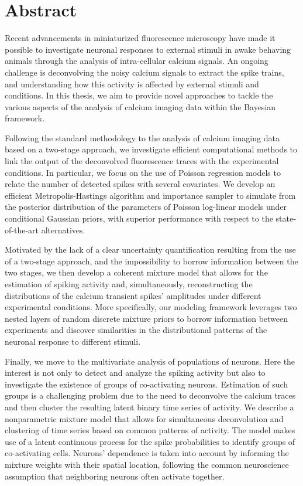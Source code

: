 \chapter*{Abstract} 
Recent advancements in miniaturized fluorescence microscopy have made it possible to investigate neuronal responses to external stimuli in awake behaving animals through the analysis of intra-cellular calcium signals. 
An ongoing challenge is deconvolving the noisy calcium signals to extract the spike trains, and understanding how this activity is affected by external stimuli and conditions.
In this thesis, we aim to provide novel approaches to tackle the various aspects of the analysis of calcium imaging data within the Bayesian framework.

Following the standard methodology to the analysis of calcium imaging data based on a two-stage approach, we investigate efficient computational methods to link the output of the deconvolved fluorescence traces with the experimental conditions. In particular, we focus on the use of Poisson regression models to relate the number of detected spikes with several covariates. We develop an efficient Metropolis-Hastings algorithm and importance sampler to simulate from the posterior distribution of the parameters of Poisson log-linear models under conditional Gaussian priors, with superior performance with respect to the state-of-the-art alternatives. 

Motivated by the lack of a clear uncertainty quantification resulting from the use of a two-stage approach, and the impossibility to borrow information between the two stages, we then develop a coherent mixture model that allows for the estimation of spiking activity and, simultaneously, reconstructing the distributions of the calcium transient spikes' amplitudes under different experimental conditions. More specifically, our modeling framework leverages two nested layers of random discrete mixture priors to borrow information between experiments and discover similarities in the distributional patterns of the neuronal response to different stimuli.

Finally, we move to the multivariate analysis of populations of neurons. Here the interest is not only to detect and analyze the spiking activity but also to investigate the existence of groups of co-activating neurons.
Estimation of such groups is a challenging problem due to the need to deconvolve the calcium traces and then cluster the resulting latent binary time series of activity. We describe a nonparametric mixture model that allows for simultaneous deconvolution and clustering of time series based on common patterns of activity. The model makes use of a latent continuous process for the spike probabilities to identify groups of co-activating cells. Neurons' dependence is taken into account by informing the mixture weights with their spatial location, following the common neuroscience assumption that neighboring neurons often activate together. 

